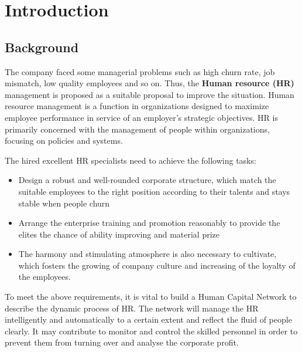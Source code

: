 \documentclass[a4paper,11pt]{article}
\begin{document}
\maketitle%
\thispagestyle{empty}%

\newpage%
\thispagestyle{empty}%
\tableofcontents%
\thispagestyle{empty}
\newpage%

\section{Introduction}

\subsection{Background}
The company faced some managerial problems such as high churn rate, job mismatch, low quality employees and so on. Thus, the \textbf{Human resource (HR)} management is proposed as a suitable proposal to improve the situation. Human resource management is a function in organizations designed to maximize employee performance in service of an employer's strategic objectives. HR is primarily concerned with the management of people within organizations, focusing on policies and systems.

The hired excellent HR specialists need to achieve the following tasks:
\begin{itemize}
    \item Design a robust and well-rounded corporate structure, which match the suitable employees to the right position according to their talents and stays stable when people churn
    \item Arrange the enterprise training and promotion reasonably to provide the elites the chance of ability improving and material prize
    \item The harmony and stimulating atmosphere is also necessary to cultivate, which fosters the growing of company culture and increasing of the loyalty of the employees.
 \end{itemize}
 To meet the above requirements, it is vital to build a Human Capital Network to describe the dynamic process of HR. The network will manage the HR intelligently and automatically to a certain extent and reflect the fluid of people clearly. It may contribute to monitor and control the skilled personnel in order to prevent them from turning over and analyse the corporate profit.
 
\end{document}

